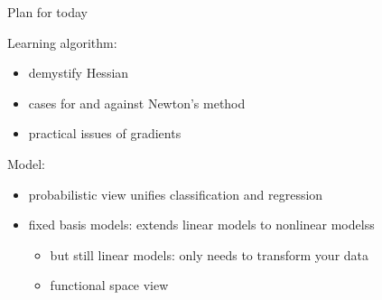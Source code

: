 \documentclass[ignorenonframetext,aspectratio=169]{beamer}
\providecommand{\tightlist}{%
  \setlength{\itemsep}{0pt}\setlength{\parskip}{0pt}}
\begin{document}
\begin{frame}{Plan for today}
\protect\hypertarget{plan-for-today}{}

Learning algorithm:

\begin{itemize}
\tightlist
\item
  demystify Hessian
\item
  cases for and against Newton's method
\item
  practical issues of gradients
\end{itemize}

\bigskip

Model:

\begin{itemize}
\tightlist
\item
  probabilistic view unifies classification and regression
\item
  fixed basis models: extends linear models to nonlinear modelss

  \begin{itemize}
  \tightlist
  \item
    but still linear models: only needs to transform your data
  \item
    functional space view
  \end{itemize}
\end{itemize}

\end{frame}
\end{document}
